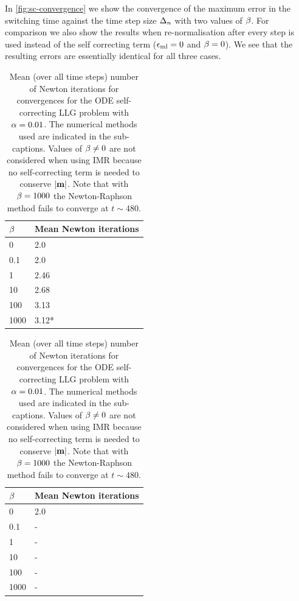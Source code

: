 In \cref{fig:sc-convergence} we show the convergence of the maximum error in the switching time against the time step size $\Delta_{n}$ with two values of $\beta$.
For comparison we also show the results when re-normalisation after every step is used instead of the self correcting term (\ie $\epsilon_{\mathrm{ml}} = 0$ and $\beta = 0$).
We see that the resulting errors are essentially identical for all three cases.

\begin{table}
  \begin{subtable}{.5\textwidth}
    \centering
    \begin{tabular}{ll}
      $\beta$ & Mean Newton iterations \\
      \hline
      0 & 2.0 \\
      0.1 & 2.0 \\
      1 & 2.46 \\
      10 & 2.68 \\
      100 & 3.13 \\
      1000 & 3.12* \\
    \end{tabular}%
    \caption{Solved with BDF2 and $\ntol = 10^{-8}$}
  \end{subtable}%
  \begin{subtable}{.5\textwidth}
    \centering
    \begin{tabular}{ll}
      $\beta$ & Mean Newton iterations \\
      \hline
      0 & 2.0 \\
      0.1 & - \\
      1 & - \\
      10 & - \\
      100 & - \\
      1000 & - \\
    \end{tabular}%
    \vfill
    \caption{Solved with IMR and $\ntol = 10^{-12}$}
  \end{subtable}%
  \caption{
    Mean (over all time steps) number of Newton iterations for convergences
    for the ODE self-correcting LLG problem with
    $\alpha = 0.01$.
    The numerical methods used are indicated in the sub-captions.
    Values of $\beta \neq 0$ are not considered when using IMR because no self-correcting term is needed to conserve $\left|{\boldsymbol{\mathrm{m}}} \right|$.
    Note that with $\beta = 1000$ the Newton-Raphson method fails to converge at $t \sim 480$.
  }
  \label{tab:sc-newton-iters}
\end{table}


